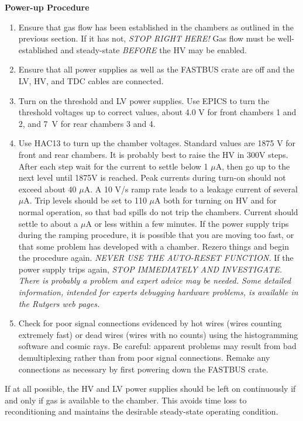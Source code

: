 {\begin{center}
{\bf Power-up Procedure}
\end{center}

\begin{enumerate}
\item {Ensure that gas flow has been established in the chambers as
outlined in the previous section.  If it has not, {\it STOP RIGHT
HERE!}  Gas flow must be well-established and steady-state
{\it BEFORE} the HV may be enabled.}
\item {Ensure that all power supplies as well as the FASTBUS crate
are off and the LV, HV, and TDC cables are connected.}
\item {Turn on the threshold and LV power supplies. Use EPICS to turn the
threshold voltages up to correct values, about 4.0 V for front chambers 
1 and 2, and 7~V for rear chambers 3 and 4.}
\item {Use HAC13 to turn up the chamber voltages. Standard
values are 1875 V for front and rear chambers.
It is probably best to raise the HV in 300V steps. After each
step wait for the current to settle below 1 $\mu$A, then
go up to the next level until 1875V is reached.
Peak currents during  turn-on should not exceed about 40 $\mu$A. 
A 10 V/s ramp rate leads to a leakage current of several $\mu$A.
Trip levels should be set to 110 $\mu$A both for turning on HV and
for normal operation, so that bad spills do not trip the chambers.
Current should settle to about a $\mu$A or less within a few minutes.
If the power supply trips during the ramping procedure, it
is possible that you are moving too fast, or that some
problem has developed with a chamber.
Rezero things and begin the procedure again.
{\it NEVER USE THE AUTO-RESET FUNCTION.}}  If
the power supply trips again, {\it STOP IMMEDIATELY AND INVESTIGATE.
There is probably a problem and expert advice may be needed.
Some detailed information, intended for experts debugging hardware
problems, is available in the Rutgers web pages. }
\item {Check for poor signal connections evidenced by hot wires (wires
counting extremely fast) or dead wires (wires with no counts) using
the histogramming software and cosmic rays.
Be careful: apparent problems may result from bad demultiplexing rather than
from poor signal connections.
Remake any connections as necessary by first powering down the FASTBUS crate.}
\end{enumerate}

If at all possible, the HV and LV power supplies should be left
on continuously if and only if gas is available to the chamber.  This
avoids time loss to reconditioning and maintains the desirable
steady-state operating condition.


}
